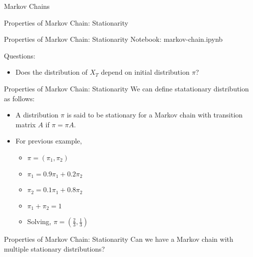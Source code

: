 \documentclass{beamer}
\begin{document}
\begin{section}{Markov Chains}
\begin{frame}{Properties of Markov Chain: Stationarity}
\begin{itemize}
        \end{itemize}
      \end{frame}
      
    

    \begin{frame}{Properties of Markov Chain: Stationarity}
        Notebook: markov-chain.ipynb

        Questions:
        \begin{itemize}
            \item Does the distribution of $X_T$ depend on initial distribution $\pi$?
        \end{itemize}
        
    \end{frame}

    \begin{frame}{Properties of Markov Chain: Stationarity}
    We can define statationary distribution as follows:
    \begin{itemize}
        \item A distribution $\pi$ is said to be stationary for a Markov chain with transition matrix $A$ if $\pi = \pi A$.
        \item For previous example, 
        \begin{itemize}
            \item $\pi = (\pi_1, \pi_2)$
            \item $\pi_1 = 0.9 \pi_1 + 0.2 \pi_2$
            \item $\pi_2 = 0.1 \pi_1 + 0.8 \pi_2$
            \item $\pi_1 + \pi_2 = 1$
            \item Solving, $\pi = (\frac{2}{3}, \frac{1}{3})$
        \end{itemize}   
    \end{itemize}     
    \end{frame}

    \begin{frame}{Properties of Markov Chain: Stationarity}
        Can we have a Markov chain with multiple stationary distributions?
    
        \pause   \begin{columns}[T] %
            \begin{column}{0.48\textwidth} %
\end{column}
\end{columns}
\end{frame}
\end{section}
\end{document}
